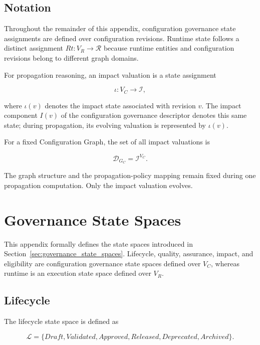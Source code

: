 \documentclass[10pt]{article}
\begin{document}
\subsection{Notation}

Throughout the remainder of this appendix, configuration governance state assignments are defined over configuration revisions. Runtime state follows a distinct assignment $Rt:V_R\rightarrow\mathcal{R}$ because runtime entities and configuration revisions belong to different graph domains.

For propagation reasoning, an impact valuation is a state assignment

\begin{equation}
	\iota : V_C \rightarrow \mathcal{I},
	\label{eq:impact_valuation}
\end{equation}

where $\iota(v)$ denotes the impact state associated with revision $v$. The
impact component $I(v)$ of the configuration governance descriptor denotes this
same state; during propagation, its evolving valuation is represented by
$\iota(v)$.

For a fixed Configuration Graph, the set of all impact valuations is

\begin{equation}
	\mathcal{D}_{G_C}
	=
	\mathcal{I}^{V_C}.
	\label{eq:impact_valuation_domain}
\end{equation}

The graph structure and the propagation-policy mapping remain fixed during one propagation computation. Only the impact valuation evolves.

\section{Governance State Spaces}
\label{appendix:state_spaces}

This appendix formally defines the state spaces introduced in
Section~\ref{sec:governance_state_spaces}. Lifecycle, quality, assurance, impact, and eligibility are configuration governance state spaces defined over $V_C$, whereas runtime is an execution state space defined over $V_R$.

\subsection{Lifecycle}

The lifecycle state space is defined as

\begin{equation}
	\mathcal{L}=
	\{
	Draft,
	Validated,
	Approved,
	Released,
	Deprecated,
	Archived
	\}.
	\label{eq:lifecycle_space}
\end{equation}
\end{document}
